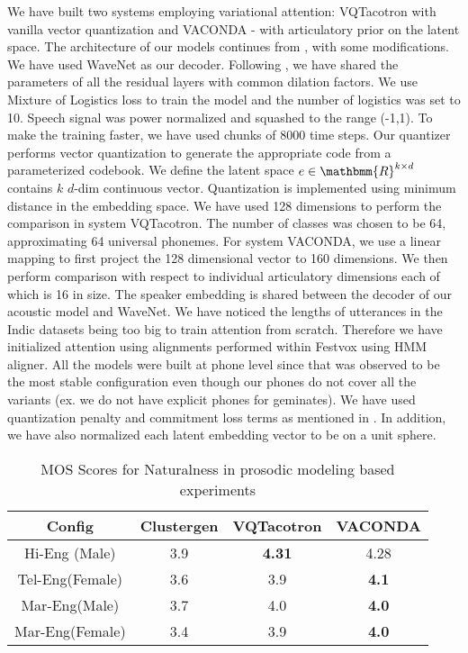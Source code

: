 We have built two systems employing variational attention: VQTacotron with vanilla vector quantization and VACONDA - with articulatory prior on the latent space. The architecture of our models continues from \cite{multilingual_convattention}, with some modifications. We have used WaveNet\cite{van2016wavenet} as our decoder. Following \cite{strubell2017fast}, we have shared the parameters of all the residual layers with common dilation factors. We use Mixture of Logistics loss to train the model and the number of logistics was set to 10. Speech signal was power normalized and squashed to the range (-1,1). To make the training faster, we have used chunks of 8000 time steps.  Our quantizer performs vector quantization to generate the appropriate code from a parameterized codebook. We define the latent space $e \in \mathbmm{R}^{k\times d}$ contains $k$ $d$-dim continuous vector. Quantization is implemented using minimum distance in the embedding space. We have used 128 dimensions to perform the comparison in system VQTacotron. The number of classes was chosen to be 64, approximating 64 universal phonemes. For system VACONDA, we use a linear mapping to first project the 128 dimensional vector to 160 dimensions. We then perform comparison with respect to individual articulatory dimensions each of which is 16 in size. The speaker embedding is shared between the decoder of our acoustic model and WaveNet. We have noticed the lengths of utterances in the Indic datasets being too big to train attention from scratch. Therefore we have initialized attention using alignments performed within Festvox using HMM aligner. All the models were built at phone level since that was observed to be the most stable configuration even though our phones do not cover all the variants (ex. we do not have explicit phones for geminates). We have used quantization penalty and commitment loss terms as mentioned in \cite{chorowski2019unsupervised}. In addition, we have also normalized each latent embedding vector  to be on a unit sphere.


\begin{table}[h]
\caption{MOS Scores for  Naturalness in prosodic modeling based experiments } 
\begin{tabular}{|c|c|c|c|}
  \hline
 Config & Clustergen & VQTacotron & VACONDA \\
  \hline
  Hi-Eng (Male) & 3.9 & \textbf{4.31} & 4.28  \\
  Tel-Eng(Female) & 3.6 & 3.9 & \textbf{4.1} \\
  Mar-Eng(Male) & 3.7 & 4.0 & \textbf{4.0} \\
  Mar-Eng(Female) & 3.4 & 3.9 & \textbf{4.0} \\
  \hline
\end{tabular}
\label{table_results}
\end{table}
